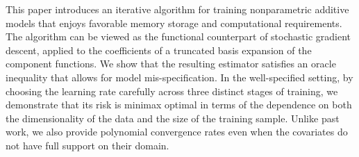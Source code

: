 This paper introduces an iterative algorithm for training nonparametric additive models that enjoys favorable memory storage and computational requirements. The algorithm can be viewed as the functional counterpart of stochastic gradient descent, applied to the coefficients of a truncated basis expansion of the component functions. We show that the resulting estimator satisfies an oracle inequality that allows for model mis-specification. In the well-specified setting, by choosing the learning rate carefully across three distinct stages of training, we demonstrate that its risk is minimax optimal in terms of the dependence on both the dimensionality of the data and the size of the training sample. Unlike past work, we also provide polynomial convergence rates even when the covariates do not have full support on their domain.